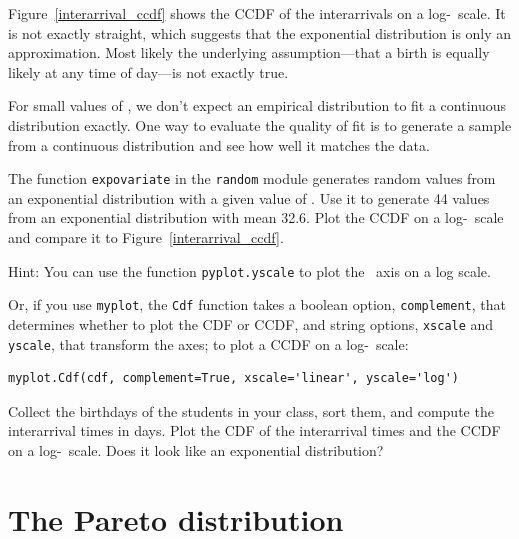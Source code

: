 \documentclass[12pt]{book}
\begin{document}
Figure~\ref{interarrival_ccdf} shows the CCDF of the interarrivals
on a log-\y~scale.  It is not exactly straight, which suggests that
the exponential distribution is only an approximation.  Most likely
the underlying assumption---that a birth is equally likely at any time
of day---is not exactly true.

\begin{exercise}
For small values of \n, we don't expect an empirical distribution
to fit a continuous distribution exactly.  One way to evaluate
the quality of fit is to generate a sample from a continuous
distribution and see how well it matches the data.

The function {\tt expovariate} in the {\tt random} module generates
random values from an exponential distribution with a given value of
\mylambda.  Use it to generate 44 values from an exponential
distribution with mean 32.6.  Plot the CCDF on a log-\y~scale and
compare it to Figure~\ref{interarrival_ccdf}.

Hint: You can use the function {\tt pyplot.yscale} to plot the \y~axis
on a log scale.

Or, if you use {\tt myplot}, the {\tt Cdf} function takes a boolean
option, {\tt complement}, that determines whether to plot the CDF or
CCDF, and string options, {\tt xscale} and {\tt yscale}, that
transform the axes; to plot a CCDF on a log-\y~scale:
%
\begin{verbatim}
myplot.Cdf(cdf, complement=True, xscale='linear', yscale='log') 
\end{verbatim}

\end{exercise}

\begin{exercise}
Collect the birthdays of the students in your class, sort them, and
compute the interarrival times in days.  Plot the CDF of the interarrival
times and the CCDF on a log-\y~scale.  Does it look like
an exponential distribution?

\end{exercise}


\section{The Pareto distribution}
\end{document}
